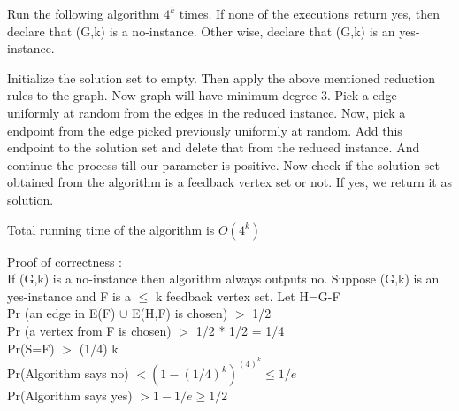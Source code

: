 Run the following algorithm $4^k$ times. If none of the
executions return yes, then declare that (G,k) is a no-instance. Other wise, declare that
(G,k) is an yes-instance.

Initialize the solution set to empty. Then apply the above mentioned reduction rules to the graph.
Now graph will have minimum degree 3. Pick a edge uniformly at random from the edges in the reduced
instance. Now, pick a endpoint from the edge picked previously uniformly at random. Add this
endpoint to the solution set and delete that from the reduced instance. And continue the process till
our parameter is positive. Now check if the solution set obtained from the algorithm is a feedback
vertex set or not. If yes, we return it as solution.

Total running time of the algorithm is $O(4^k)$

Proof of correctness : \\
If (G,k) is a no-instance then algorithm always outputs no.
Suppose (G,k) is an yes-instance and F is a $\leq$ k feedback vertex set.
Let H=G-F \\
Pr (an edge in E(F) $\cup$ E(H,F) is chosen) $>$ 1/2 \\
Pr (a vertex from F is chosen) $>$ 1/2 * 1/2 = 1/4 \\
Pr(S=F) $>$ (1/4) k \\
Pr(Algorithm says no) $< (1-(1/4)^k)^{(4)^k} \leq 1/e $ \\
Pr(Algorithm says yes) $> 1- 1/e \geq 1/2 $




